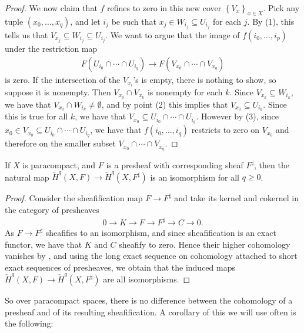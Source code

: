 \documentclass[11pt]{amsart}
\begin{document}
\begin{proof}
We now claim that $f$ refines to zero in this new cover $\left\{ V_x \right\}_{x\in X}$. Pick any tuple $(x_0, \ldots, x_q)$, and let $i_j$ be such that $x_j \in W_{i_j} \subseteq U_{i_j}$ for each $j$. By (1), this tells us that $V_{x_j} \subseteq W_{i_j} \subseteq U_{i_j}$. We want to argue that the image of $f(i_0, \ldots, i_p)$ under the restriction map
\begin{align*}
    F(U_{i_0} \cap \cdots \cap U_{i_q}) \to F(V_{x_0}\cap \cdots \cap V_{x_q})
\end{align*}
is zero. If the intersection of the $V_{x_i}$'s is empty, there is nothing to show, so suppose it is nonempty. Then $V_{x_0}\cap V_{x_k}$ is nonempty for each $k$. Since $V_{x_k} \subseteq W_{i_k}$, we have that $V_{x_0} \cap W_{i_k} \ne \emptyset$, and by point (2) this implies that $V_{x_0} \subseteq U_{i_k}$. Since this is true for all $k$, we have that $V_{x_0} \subseteq U_{i_0} \cap \cdots \cap U_{i_q}$. However by (3), since $x_0 \in V_{x_0}\subseteq U_{i_0} \cap \cdots \cap U_{i_q}$, we have that $f(i_0, \ldots, i_q)$ restricts to zero on $V_{x_0}$ and therefore on the smaller subset $V_{x_0} \cap \cdots \cap V_{x_q}$.
\end{proof}


\begin{theorem}\label{thm:paracompact-space-Cech-cohomology-of-sheafification} 
If $X$ is paracompact, and $F$ is a presheaf with corresponding sheaf $F^\sharp$, then the natural map $\check{H}^q(X,F) \to \check{H}^q(X,F^\sharp)$ is an isomorphism for all $q\ge0$.
\end{theorem}
\begin{proof} Consider the sheafification map $F \to F^\sharp$ and take its kernel and cokernel in the category of presheaves
\begin{align*}
    0 \to K \to F \to F^\sharp \to C \to 0.
\end{align*}
As $F \to F^\sharp$ sheafifies to an isomorphism, and since sheafification is an exact functor, we have that $K$ and $C$ sheafify to zero. Hence their higher cohomology vanishes by , and using the long exact sequence on cohomology attached to short exact sequences of presheaves, we obtain that the induced maps $\check{H}^q(X,F) \to \check{H}^q(X,F^\sharp)$ are all isomorphisms.
\end{proof}

So over paracompact spaces, there is no difference between the cohomology of a presheaf and of its resulting sheafification. A corollary of this we will use often is the following:
\end{document}
